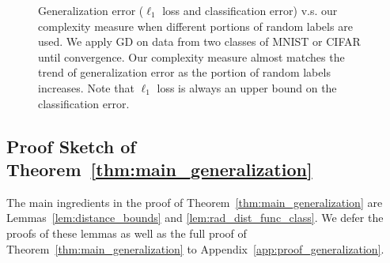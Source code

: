 \begin{figure}[t]
	\centering
	\caption{Generalization error ($\ell_1$ loss and classification error) v.s. our complexity measure when different portions of random labels are used.
		We apply GD on data from two classes of MNIST or CIFAR until convergence.
			Our complexity measure almost matches the trend of generalization error as the portion of random labels increases.
			Note that $\ell_1$ loss is always an upper bound on the classification error.
		}
	\label{fig:generalization}
	\vspace{-0.5cm}
\end{figure}



\subsection{Proof Sketch of Theorem~\ref{thm:main_generalization}} \label{sec:proof_sketch_generalization}

The main ingredients in the proof of Theorem~\ref{thm:main_generalization} are Lemmas~\ref{lem:distance_bounds} and \ref{lem:rad_dist_func_class}. We defer the proofs of these lemmas as well as the full proof of Theorem~\ref{thm:main_generalization} to Appendix~\ref{app:proof_generalization}.

